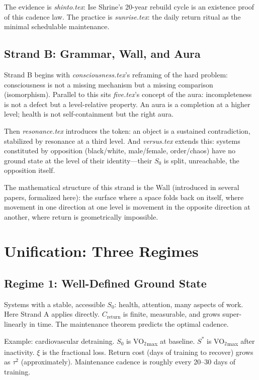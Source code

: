 \documentclass[12pt]{article}
\begin{document}
The evidence is \textit{shinto.tex}: Ise Shrine's 20-year rebuild cycle is an existence proof of this cadence law. The practice is \textit{sunrise.tex}: the daily return ritual as the minimal schedulable maintenance.

\subsection{Strand B: Grammar, Wall, and Aura}

Strand B begins with \textit{consciousness.tex}'s reframing of the hard problem: consciousness is not a missing mechanism but a missing comparison (isomorphism). Parallel to this sits \textit{five.tex}'s concept of the aura: incompleteness is not a defect but a level-relative property. An aura is a completion at a higher level; health is not self-containment but the right aura.

Then \textit{resonance.tex} introduces the token: an object is a sustained contradiction, stabilized by resonance at a third level. And \textit{versus.tex} extends this: systems constituted by opposition (black/white, male/female, order/chaos) have no ground state at the level of their identity—their $S_0$ is split, unreachable, the opposition itself.

The mathematical structure of this strand is the Wall (introduced in several papers, formalized here): the surface where a space folds back on itself, where movement in one direction at one level is movement in the opposite direction at another, where return is geometrically impossible.

\section{Unification: Three Regimes}

\subsection{Regime 1: Well-Defined Ground State}

Systems with a stable, accessible $S_0$: health, attention, many aspects of work. Here Strand A applies directly. $C_{\text{return}}$ is finite, measurable, and grows super-linearly in time. The maintenance theorem predicts the optimal cadence.

Example: cardiovascular detraining. $S_0$ is VO$_2$\textsubscript{max} at baseline. $S^*$ is VO$_2$\textsubscript{max} after inactivity. $\xi$ is the fractional loss. Return cost (days of training to recover) grows as $\tau^2$ (approximately). Maintenance cadence is roughly every 20--30 days of training.
\end{document}
